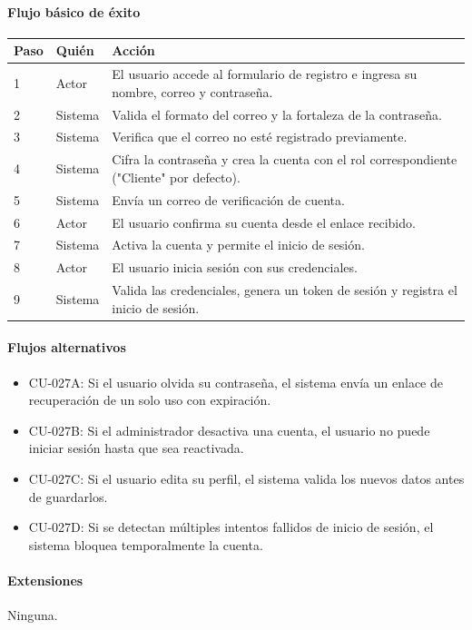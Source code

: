 \paragraph{Flujo básico de éxito}
\begin{longtable}{P{1.1cm}P{1.8cm}P{10.5cm}}
\toprule
\textbf{Paso} & \textbf{Quién} & \textbf{Acción}\\
\midrule
{} & Actor & El usuario accede al formulario de registro e ingresa su nombre, correo y contraseña.\\
2 & Sistema & Valida el formato del correo y la fortaleza de la contraseña.\\
3 & Sistema & Verifica que el correo no esté registrado previamente.\\
4 & Sistema & Cifra la contraseña y crea la cuenta con el rol correspondiente ("Cliente" por defecto).\\
5 & Sistema & Envía un correo de verificación de cuenta.\\
6 & Actor & El usuario confirma su cuenta desde el enlace recibido.\\
7 & Sistema & Activa la cuenta y permite el inicio de sesión.\\
8 & Actor & El usuario inicia sesión con sus credenciales.\\
9 & Sistema & Valida las credenciales, genera un token de sesión y registra el inicio de sesión.\\
\bottomrule
\end{longtable}

\paragraph{Flujos alternativos}
\begin{itemize}[leftmargin=1.4em, topsep=1pt]
  \item CU-027A: Si el usuario olvida su contraseña, el sistema envía un enlace de recuperación de un solo uso con expiración.
  \item CU-027B: Si el administrador desactiva una cuenta, el usuario no puede iniciar sesión hasta que sea reactivada.
  \item CU-027C: Si el usuario edita su perfil, el sistema valida los nuevos datos antes de guardarlos.
  \item CU-027D: Si se detectan múltiples intentos fallidos de inicio de sesión, el sistema bloquea temporalmente la cuenta.
\end{itemize}

\paragraph{Extensiones}
Ninguna.

